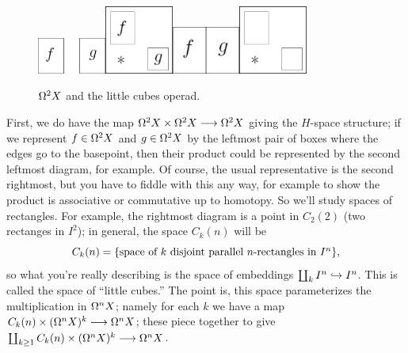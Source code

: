 \begin{figure}[ht!]
\centering\includegraphics[width=0.2\textwidth]{figures/figure35-1.pdf}\;\includegraphics[width=0.2\textwidth]{figures/figure35-2.pdf}\;\includegraphics[width=0.2\textwidth]{figures/figure35-3.pdf}\;\includegraphics[width=0.2\textwidth]{figures/figure35-4.pdf}
\caption{\small $\Omega^2 X$ and the little cubes operad.}
\end{figure}
First, we do have the map $\Omega^2 X \times \Omega^2 X \longrightarrow \Omega^2 X$ giving the $H$-space structure; if we represent $f \in \Omega^2 X$ and $g \in \Omega^2 X$ by the leftmost pair of boxes where the edges go to the basepoint, then their product could be represented by the second leftmost diagram, for example.  Of course, the usual representative is the second rightmost, but you have to fiddle with this any way, for example to show the product is associative or commutative up to homotopy.  So we'll study spaces of rectangles.  For example, the rightmost diagram is a point in $C_2(2)$ (two rectanges in $I^2$); in general, the space $C_k(n)$ will be
\[
C_k(n) = \{ \hbox{space of $k$ disjoint parallel $n$-rectangles in $I^n$} \}
,\]
so what you're really describing is the space of embeddings $\coprod_k I^n \hookrightarrow I^n$.  This is called the space of ``little cubes.''  The point is, this space parameterizes the multiplication in $\Omega^n X$; namely for each $k$ we have a map $C_k(n) \times (\Omega^n X)^k \longrightarrow \Omega^n X$; these piece together to give $\coprod_{k \ge 1} C_k(n) \times (\Omega^n X)^k \longrightarrow \Omega^n X$.

